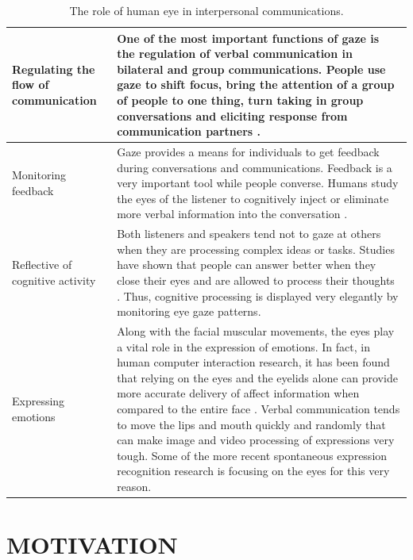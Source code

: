 \documentclass[oneside,11pt]{memoir}
\begin{document}
\begin{table}[hpdf]
\begin{center}
\caption{The role of human eye in interpersonal communications.}
\label{Tab:Table4}
\begin{tabularx}{5.5in}{|X|X|}
\hline
Regulating the flow of communication & One of the most important functions of gaze is the regulation of verbal communication in bilateral and group communications. People use gaze to shift focus, bring the attention of a group of people to one thing, turn taking in group conversations \cite{mast_dominance_2002} and eliciting response from communication partners \cite{bavelas_listener_2002}. \\
\hline
Monitoring feedback & Gaze provides a means for individuals to get feedback during conversations and communications. Feedback is a very important tool while people converse. Humans study the eyes of the listener to cognitively inject or eliminate more verbal information into the conversation \cite{van_dulmen_shifts_1997}. \\
\hline
Reflective of cognitive activity & Both listeners and speakers tend not to gaze at others when they are processing complex ideas or tasks. Studies have shown that people can answer better when they close their eyes and are allowed to process their thoughts \cite{glenberg_averting_1998}. Thus, cognitive processing is displayed very elegantly by monitoring eye gaze patterns. \\
\hline
Expressing emotions & Along with the facial muscular movements, the eyes play a vital role in the expression of emotions. In fact, in human computer interaction research, it has been found that relying on the eyes and the eyelids alone can provide more accurate delivery of affect information when compared to the entire face \cite{orozco_confidence_2008}. Verbal communication tends to move the lips and mouth quickly and randomly that can make image and video processing of expressions very tough. Some of the more recent spontaneous expression recognition research is focusing on the eyes for this very reason. \\
\hline
\end{tabularx}
\end{center}
\end{table}



\chapter{MOTIVATION}
\DoubleSpacing
\setlength{\parindent}{.5in}
\end{document}
